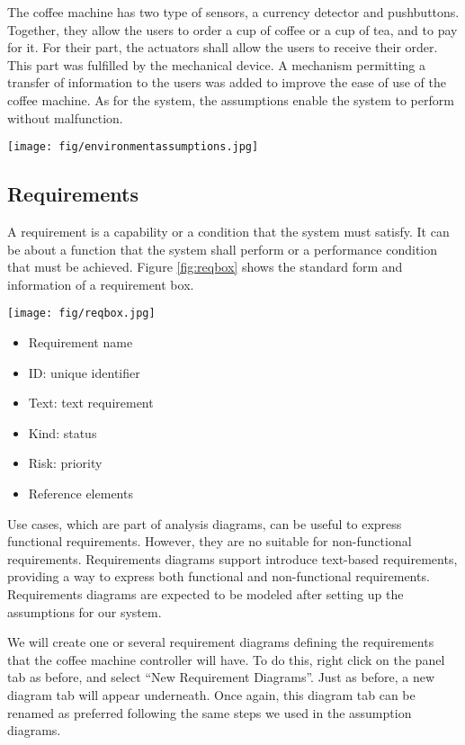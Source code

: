 \documentclass[12pt]{article}
\begin{document}
The coffee machine has two type of sensors, a currency detector and pushbuttons. Together, they allow the users to order a cup of coffee or a cup of tea, and to pay for it. For their part, the actuators shall allow the users to receive their order. This part was fulfilled by the mechanical device. A mechanism permitting a transfer of information to the users was added to improve the ease of use of the coffee machine. As for the system, the assumptions enable the system to perform without malfunction.

\begin{figure*}[htbp]
\centering
\texttt{[image: fig/environmentassumptions.jpg]}
\caption{Environment Assumptions} \label{fig:envassumptions}
\end{figure*}

\subsection{Requirements}
A requirement is a capability or a condition that the system must satisfy. It can be about a function that the system shall perform or a performance condition that must be achieved. Figure \ref{fig:reqbox} shows the standard form and information of a requirement box.

\begin{figure*}[htbp]
\centering
\texttt{[image: fig/reqbox.jpg]}
\caption{Requirement Box} \label{fig:reqbox}
\end{figure*}

\begin{itemize}
\item Requirement name
\item ID: unique identifier
\item Text: text requirement
\item Kind: status
\item Risk: priority
\item Reference elements
\end{itemize}

Use cases, which are part of analysis diagrams, can be useful to express  functional requirements. However, they are no  suitable for non-functional requirements. Requirements diagrams support introduce text-based requirements, providing a way to express both functional and non-functional requirements. Requirements diagrams are expected to be modeled after setting up the assumptions for our system.

We will create one or several requirement diagrams defining the requirements that the coffee machine controller will have. To do this, right click on the panel tab as before, and select “New Requirement Diagrams”. Just as before, a new diagram tab will appear underneath. Once again, this diagram tab can be renamed as preferred following the same steps we used in the assumption diagrams.
	
\end{document}
